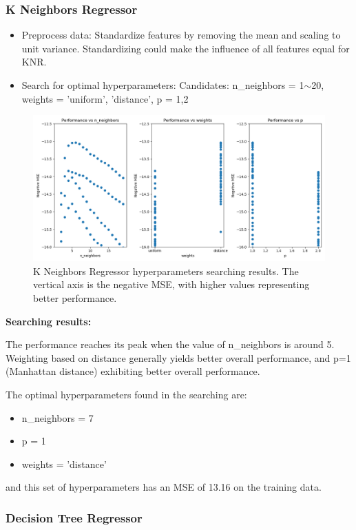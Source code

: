 \documentclass[a4paper]{article}
\begin{document}
\subsubsection{K Neighbors Regressor}

\begin{itemize}
    \item Preprocess data: Standardize features by removing the mean and scaling to unit variance. Standardizing could make the influence of all features equal for KNR.
    \item Search for optimal hyperparameters: Candidates: n\_neighbors = 1$\sim$20, weights = 'uniform', 'distance', p = 1,2    
\end{itemize}

\begin{figure}[htbp]
    \centering
    \includegraphics[width = 0.8\linewidth]{Pics/KNR_training.png}
    \caption[]{K Neighbors Regressor hyperparameters searching results. The vertical axis is the negative MSE, with higher values representing better performance.}
    \label{fig:KNR_Searching}
\end{figure}
\FloatBarrier

\textbf{Searching results:}


The performance reaches its peak when the value of n\_neighbors is around 5. Weighting based on distance generally yields better overall performance, and p=1 (Manhattan distance) exhibiting better overall performance.

The optimal hyperparameters found in the searching are: 
\begin{itemize}
    \item n\_neighbors = 7
    \item p = 1
    \item weights = 'distance'
\end{itemize}

and this set of hyperparameters has an MSE of 13.16 on the training data. 


\subsubsection{Decision Tree Regressor}
\end{document}
